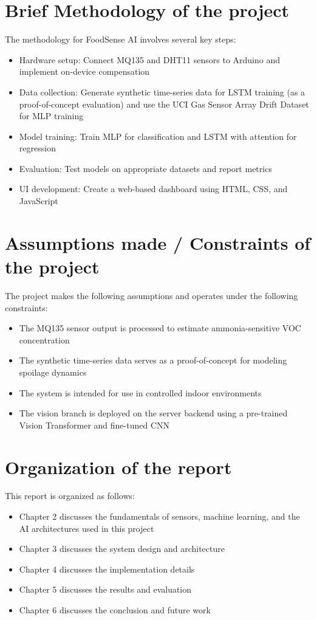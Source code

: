\section[Brief Methodology of the project]{\textbf{Brief Methodology of the project}}
The methodology for FoodSense AI involves several key steps:
\begin{itemize}
    \item Hardware setup: Connect MQ135 and DHT11 sensors to Arduino and implement on-device compensation
    \item Data collection: Generate synthetic time-series data for LSTM training (as a proof-of-concept evaluation) and use the UCI Gas Sensor Array Drift Dataset for MLP training
    \item Model training: Train MLP for classification and LSTM with attention for regression
    \item Evaluation: Test models on appropriate datasets and report metrics
    \item UI development: Create a web-based dashboard using HTML, CSS, and JavaScript
\end{itemize}

\section[Assumptions made / Constraints of the project]{\textbf{Assumptions made / Constraints of the project}}
The project makes the following assumptions and operates under the following constraints:
\begin{itemize}
    \item The MQ135 sensor output is processed to estimate ammonia-sensitive VOC concentration
    \item The synthetic time-series data serves as a proof-of-concept for modeling spoilage dynamics
    \item The system is intended for use in controlled indoor environments
    \item The vision branch is deployed on the server backend using a pre-trained Vision Transformer and fine-tuned CNN
\end{itemize}

\section[Organization of the report]{\textbf{Organization of the report}}
This report is organized as follows:
\begin{itemize}
    \item Chapter 2 discusses the fundamentals of sensors, machine learning, and the AI architectures used in this project
    \item Chapter 3 discusses the system design and architecture
    \item Chapter 4 discusses the implementation details
    \item Chapter 5 discusses the results and evaluation
    \item Chapter 6 discusses the conclusion and future work
\end{itemize}

